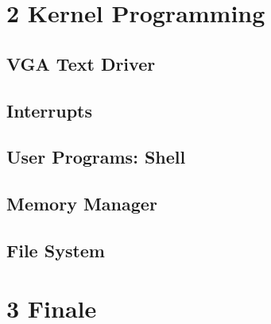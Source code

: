 \documentclass[openany, 12px]{book}
\begin{document}
\newpage
\chapter*{2 Kernel Programming}
\setcounter{section}{-1}

\section{VGA Text Driver}

\section{Interrupts}

\section{User Programs: Shell}

\section{Memory Manager}

\section{File System}

\clearpage

\newpage
\chapter*{3 Finale}
\setcounter{section}{-1}
\clearpage
\end{document}
